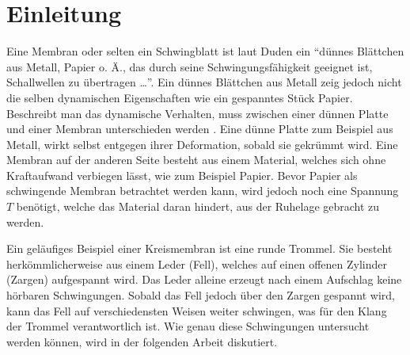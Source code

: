%
%
%
\section{Einleitung\label{kreismembran:section:teil0}}
Eine Membran oder selten ein Schwingblatt ist laut Duden \cite{kreismembran:Duden:Membran} ein ``dünnes Blättchen aus Metall, Papier o. Ä., das durch seine Schwingungsfähigkeit geeignet ist, Schallwellen zu übertragen \dots''. 
%
%
Ein dünnes Blättchen aus Metall zeig jedoch nicht die selben dynamischen Eigenschaften wie ein gespanntes Stück Papier. 
Beschreibt man das dynamische Verhalten, muss zwischen einer dünnen Platte und einer Membran unterschieden werden \cite{kreismembran:membrane_vs_thin_plate}. 
%
Eine dünne Platte zum Beispiel aus Metall, wirkt selbst entgegen ihrer Deformation, sobald sie gekrümmt wird. 
Eine Membran auf der anderen Seite besteht aus einem Material, welches sich ohne Kraftaufwand verbiegen lässt, wie zum Beispiel Papier. 
Bevor Papier als schwingende Membran betrachtet werden kann, wird jedoch noch eine Spannung $ T $ benötigt, welche das Material daran hindert, aus der Ruhelage gebracht zu werden. 
%

Ein geläufiges Beispiel einer Kreismembran ist eine runde Trommel. 
%
Sie besteht herkömmlicherweise aus einem Leder (Fell), welches auf einen offenen Zylinder (Zargen) aufgespannt wird. 
%
%
Das Leder alleine erzeugt nach einem Aufschlag keine hörbaren Schwingungen. 
Sobald das Fell jedoch über den Zargen gespannt wird, kann das Fell auf verschiedensten Weisen weiter schwingen, was für den Klang der Trommel verantwortlich ist. 
Wie genau diese Schwingungen untersucht werden können, wird in der folgenden Arbeit diskutiert.
	

